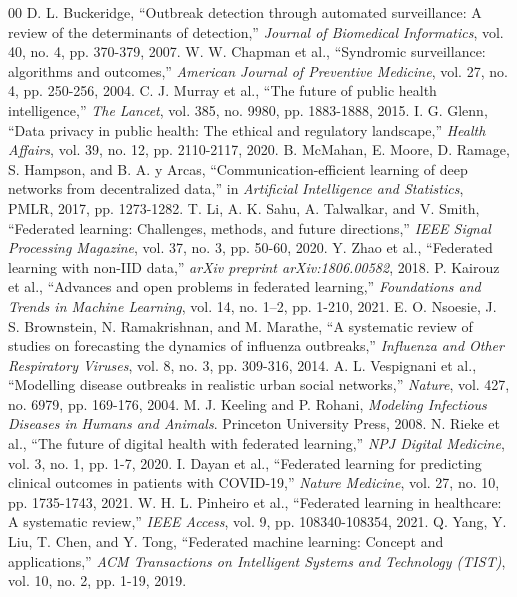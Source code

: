 \documentclass[conference]{IEEEtran}
\begin{document}
\begin{thebibliography}{00}
 D. L. Buckeridge, ``Outbreak detection through automated surveillance: A review of the determinants of detection,'' \textit{Journal of Biomedical Informatics}, vol. 40, no. 4, pp. 370-379, 2007.
 W. W. Chapman et al., ``Syndromic surveillance: algorithms and outcomes,'' \textit{American Journal of Preventive Medicine}, vol. 27, no. 4, pp. 250-256, 2004.
 C. J. Murray et al., ``The future of public health intelligence,'' \textit{The Lancet}, vol. 385, no. 9980, pp. 1883-1888, 2015.
 I. G. Glenn, ``Data privacy in public health: The ethical and regulatory landscape,'' \textit{Health Affairs}, vol. 39, no. 12, pp. 2110-2117, 2020.
 B. McMahan, E. Moore, D. Ramage, S. Hampson, and B. A. y Arcas, ``Communication-efficient learning of deep networks from decentralized data,'' in \textit{Artificial Intelligence and Statistics}, PMLR, 2017, pp. 1273-1282.
 T. Li, A. K. Sahu, A. Talwalkar, and V. Smith, ``Federated learning: Challenges, methods, and future directions,'' \textit{IEEE Signal Processing Magazine}, vol. 37, no. 3, pp. 50-60, 2020.
 Y. Zhao et al., ``Federated learning with non-IID data,'' \textit{arXiv preprint arXiv:1806.00582}, 2018.
 P. Kairouz et al., ``Advances and open problems in federated learning,'' \textit{Foundations and Trends in Machine Learning}, vol. 14, no. 1–2, pp. 1-210, 2021.
 E. O. Nsoesie, J. S. Brownstein, N. Ramakrishnan, and M. Marathe, ``A systematic review of studies on forecasting the dynamics of influenza outbreaks,'' \textit{Influenza and Other Respiratory Viruses}, vol. 8, no. 3, pp. 309-316, 2014.
 A. L. Vespignani et al., ``Modelling disease outbreaks in realistic urban social networks,'' \textit{Nature}, vol. 427, no. 6979, pp. 169-176, 2004.
 M. J. Keeling and P. Rohani, \textit{Modeling Infectious Diseases in Humans and Animals}. Princeton University Press, 2008.
 N. Rieke et al., ``The future of digital health with federated learning,'' \textit{NPJ Digital Medicine}, vol. 3, no. 1, pp. 1-7, 2020.
 I. Dayan et al., ``Federated learning for predicting clinical outcomes in patients with COVID-19,'' \textit{Nature Medicine}, vol. 27, no. 10, pp. 1735-1743, 2021.
 W. H. L. Pinheiro et al., ``Federated learning in healthcare: A systematic review,'' \textit{IEEE Access}, vol. 9, pp. 108340-108354, 2021.
 Q. Yang, Y. Liu, T. Chen, and Y. Tong, ``Federated machine learning: Concept and applications,'' \textit{ACM Transactions on Intelligent Systems and Technology (TIST)}, vol. 10, no. 2, pp. 1-19, 2019.
\end{thebibliography}
\end{document}
